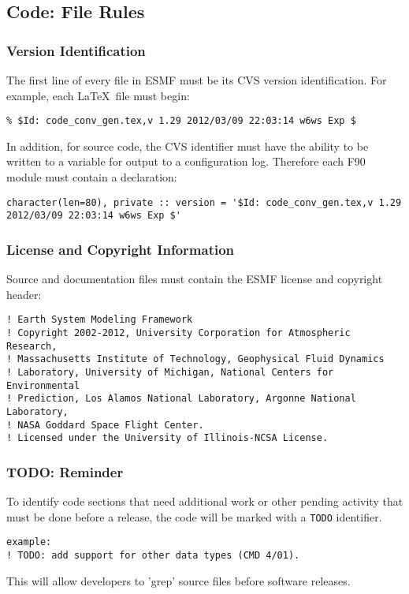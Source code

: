 \subsection{Code: File Rules} 

\subsubsection{Version Identification} 
The first line of every file in ESMF
  must be its CVS version identification. For example, each \LaTeX\ 
  file must begin:
\begin{verbatim}
% $Id: code_conv_gen.tex,v 1.29 2012/03/09 22:03:14 w6ws Exp $ 
\end{verbatim}

In addition, for source code, the CVS identifier must have the 
ability to be written to a variable for output to a configuration log.  
Therefore each F90 module must contain a declaration:
\begin{verbatim}
character(len=80), private :: version = '$Id: code_conv_gen.tex,v 1.29 2012/03/09 22:03:14 w6ws Exp $'
\end{verbatim}

\subsubsection{License and Copyright Information}

Source and documentation files must contain the ESMF license and 
copyright header:

\begin{verbatim}
! Earth System Modeling Framework
! Copyright 2002-2012, University Corporation for Atmospheric Research,
! Massachusetts Institute of Technology, Geophysical Fluid Dynamics
! Laboratory, University of Michigan, National Centers for Environmental
! Prediction, Los Alamos National Laboratory, Argonne National Laboratory,
! NASA Goddard Space Flight Center.
! Licensed under the University of Illinois-NCSA License.
\end{verbatim}

\subsubsection{TODO: Reminder} 
To identify code sections that need
additional work or other pending activity that must be done before a release,
the code will be marked with a {\tt TODO} identifier. 
\begin{verbatim}
example:
! TODO: add support for other data types (CMD 4/01).
\end{verbatim}
This will allow developers to 'grep' source files before software releases. 

